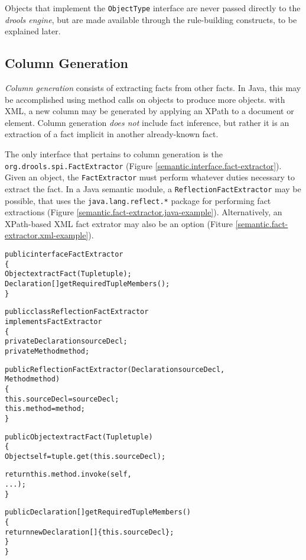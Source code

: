 \documentclass[10pt,letterpaper]{article}
\newenvironment{codelisting}%
	{\begin{minipage}{250pt}\small\begin{alltt}}%
	{\end{alltt}\end{minipage}}
\begin{document}
Objects that implement the \verb|ObjectType| interface are never
passed directly to the \emph{drools engine}, but are made available
through the rule-building constructs, to be explained later.

\subsection{Column Generation}

\emph{Column generation} consists of extracting facts from other
facts.  In Java, this may be accomplished using method calls on
objects to produce more objects.  with XML, a new column may be
generated by applying an XPath to a document or element.  Column
generation \emph{does not} include fact inference, but rather
it is an extraction of a fact implicit in another already-known
fact.

The only interface that pertains to column generation is the
\verb|org.drools.spi.FactExtractor| (Figure
\ref{semantic.interface.fact-extractor}).
Given an object, the \verb|FactExtractor| must perform whatever 
duties necessary to extract the fact. In a Java semantic module, a 
\verb|ReflectionFactExtractor| may be possible, that uses the
\verb|java.lang.reflect.*| package for performing fact 
extractions (Figure \ref{semantic.fact-extractor.java-example}).
Alternatively, an XPath-based XML fact extrator may also
be an option (Fiture \ref{semantic.fact-extractor.xml-example}).

\begin{figure*}
	\begin{codelisting}
	public interface FactExtractor
	\{
	     Object extractFact(Tuple tuple);
	     Declaration[] getRequiredTupleMembers();
	\}
	\end{codelisting}
	\caption{The \emph{FactExtractor} interface.}
	\label{semantic.interface.fact-extractor}
\end{figure*}

\begin{figure*}
	\begin{codelisting}
	public class ReflectionFactExtractor 
	             implements FactExtractor
	\{
	     private Declaration sourceDecl;
	     private Method      method;

	     public ReflectionFactExtractor(Declaration sourceDecl,
	                                    Method method)
	     \{
	          this.sourceDecl = sourceDecl;
	          this.method     = method;
	     \}

	     public Object extractFact(Tuple tuple)
	     \{
	          Object self = tuple.get( this.sourceDecl );

	          return this.method.invoke( self,
	                                     ... );
	     \}

	     public Declaration[] getRequiredTupleMembers()
	     \{
	          return new Declaration[] \{ this.sourceDecl \};
	     \}
	\}
	\end{codelisting}
	\caption{Example \emph{FactExtractor} implementing Java method semantics.}
	\label{semantic.fact-extractor.java-example}
\end{figure*}
\end{document}
